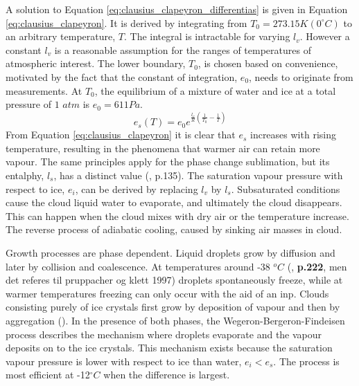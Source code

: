 A solution to Equation \eqref{eq:clausius_clapeyron_differentias} is given in Equation \eqref{eq:clausius_clapeyron}. It is derived by integrating from $T_0 = 273.15K \left(0 ^{\circ}C \right)$ to an arbitrary temperature, $T$. The integral is intractable for varying $l_v$. However a constant $l_v$ is %
a reasonable assumption for the ranges of temperatures of atmospheric interest. The lower boundary, $T_0$, is chosen based on convenience, motivated by the fact that the constant of integration,  $e_0$, needs to originate from measurements. At $T_0$, the equilibrium of a mixture of water and ice at a total pressure of $1$ $atm$ is $e_0 = 611Pa$. 
\begin{equation} \label{eq:clausius_clapeyron}
    e_s\left( T \right) = e_0 e^{\frac{l_v}{R} \left( \frac{1}{T_0} - \frac{1}{T} \right) }
\end{equation}
From Equation \eqref{eq:clausius_clapeyron} it is clear that $e_s$ increases with rising temperature, resulting in the phenomena that warmer air can retain more vapour. The same principles apply for the phase change sublimation, but its entalphy, $l_s$, has a distinct value (\cite{cloud_phys_book_johanne}, p.135). The saturation vapour pressure with respect to ice, $e_i$, can be derived by replacing $l_v$ by $l_s$. Subsaturated conditions cause the cloud liquid water to evaporate, and ultimately the cloud disappears. This can happen when the cloud mixes with dry air or the temperature increase. The reverse process of adiabatic cooling, caused by sinking air masses in cloud. 

Growth processes are phase dependent. Liquid droplets grow by diffusion and later by collision and coalescence. At temperatures around -38 $^oC$ (\cite{lohmann2016}, \textbf{p.222}, men det referes til pruppacher og klett 1997) droplets spontaneously freeze, while at warmer temperatures freezing can only occur with the aid of an  \acrshort{inp}. Clouds consisting purely of ice crystals first grow by deposition of vapour and then by aggregation (\cite{Fowler1996LiquidAssumptions}). In the presence of both phases, the Wegeron-Bergeron-Findeisen process describes the mechanism where droplets evaporate and the vapour deposits on to the ice crystals. %
This mechanism exists because the saturation vapour pressure is lower with respect to ice than water, $e_i < e_s$. The process is most efficient at -12$^{\circ}C$ when the difference is largest.


